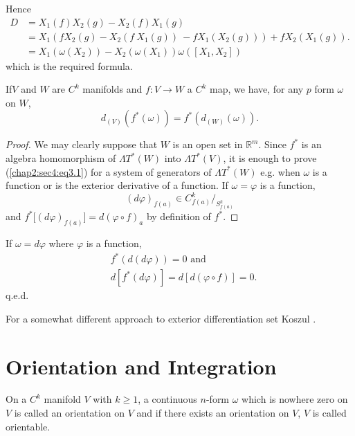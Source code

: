 Hence
\begin{align*}
  D &= X_1 (f)  X_2  (g) - X_2  (f)  X_1 (g)\\
  &= X_1 (f X_2 (g) - X_2 (f ~ X_1 (g)) ~ - f X_1 (X_2 (g))) + f  X_2
  (X_1 (g)).\\ 
  &=  X_1 (\omega (X_2))  - X_2 (\omega (X_1))  \omega ( [X_1, X_2] )
\end{align*}
which is the required formula.

\begin{proposition}\label{chap2:sec4:prop2} %
  If\pageoriginale $V$ and $W$ are $C^k$ manifolds and $f: V \to W$
  a $C^k$ map,  we have, for any $p$ form $\omega$ on $W$, 
  \begin{equation}
    d_{(V)} (f^* (\omega )) = f^* (d_{(W)} (\omega
    )). \tag{3.1}\label{chap2:sec4:eq3.1} 
  \end{equation} 
\end{proposition}

\begin{proof}
  We may clearly suppose that $W$ is an open set in
  $\mathbb{R}^m$. Since $f^*$ is an algebra homomorphism of $\Lambda T^*
  (W)$ into $\Lambda T^* (V)$, it is enough to prove
  (\ref{chap2:sec4:eq3.1}) for a 
  system of generators of $\Lambda T^* (W)$ e.g. when $\omega$ is a
  function or is the exterior derivative of a function. If  $\omega =
  \varphi$ is a function, 
  $$
  (d \varphi)_{f (a)} \in C^k_{f (a)} /_{S^k_{f (a)}}
  $$
  and $f^* \big[ (d \varphi)_{f (a)} \big] = d (\varphi \circ f)_a$ by
  definition of $f^*$. 
\end{proof}

If $\omega = d\varphi$ where $\varphi$  is a function,
\begin{align*}
  &f^* (d (d \varphi )) = 0  \text{ and } \\
  &d [ f^* (d \varphi )] = d [ d (\varphi \circ f ) ] = 0.
\end{align*}
\hfill{q.e.d.}

For a somewhat different approach to exterior differentiation set
Koszul \cite{22}. 

\section{Orientation and Integration}\label{chap2:sec5} %

\begin{defi*}
  On a $C^k$ manifold $V$ with $k \geq 1$, a continuous $n$-form
  $\omega$ which is nowhere zero on $V$ is called an orientation on
  $V$ and if there exists an orientation on $V$, $V$ is called
  orientable. 
\end{defi*}

